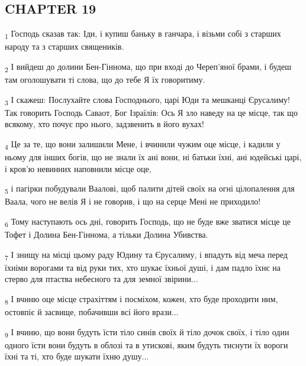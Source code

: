 \subsection{CHAPTER 19}
\begin{tcolorbox}
\textsubscript{1} Господь сказав так: Іди, і купиш баньку в ганчара, і візьми собі з старших народу та з старших священиків.
\end{tcolorbox}
\begin{tcolorbox}
\textsubscript{2} І вийдеш до долини Бен-Гіннома, що при вході до Череп'яної брами, і будеш там оголошувати ті слова, що до тебе Я їх говоритиму.
\end{tcolorbox}
\begin{tcolorbox}
\textsubscript{3} І скажеш: Послухайте слова Господнього, царі Юди та мешканці Єрусалиму! Так говорить Господь Саваот, Бог Ізраїлів: Ось Я зло наведу на це місце, так що всякому, хто почує про нього, задзвенить в його вухах!
\end{tcolorbox}
\begin{tcolorbox}
\textsubscript{4} Це за те, що вони залишили Мене, і вчинили чужим оце місце, і кадили у ньому для інших богів, що не знали їх ані вони, ні батьки їхні, ані юдейські царі, і кров'ю невинних наповнили місце оце,
\end{tcolorbox}
\begin{tcolorbox}
\textsubscript{5} і пагірки побудували Ваалові, щоб палити дітей своїх на огні цілопалення для Ваала, чого не велів Я і не говорив, і що на серце Мені не приходило!
\end{tcolorbox}
\begin{tcolorbox}
\textsubscript{6} Тому наступають ось дні, говорить Господь, що не буде вже зватися місце це Тофет і Долина Бен-Гіннома, а тільки Долина Убивства.
\end{tcolorbox}
\begin{tcolorbox}
\textsubscript{7} І знищу на місці цьому раду Юдину та Єрусалиму, і впадуть від меча перед їхніми ворогами та від руки тих, хто шукає їхньої душі, і дам падло їхнє на стерво для птаства небесного та для земної звірини...
\end{tcolorbox}
\begin{tcolorbox}
\textsubscript{8} І вчиню оце місце страхіттям і посміхом, кожен, хто буде проходити ним, остовпіє й засвище, побачивши всі його врази...
\end{tcolorbox}
\begin{tcolorbox}
\textsubscript{9} І вчиню, що вони будуть їсти тіло синів своїх й тіло дочок своїх, і тіло один одного їсти вони будуть в облозі та в утискові, яким будуть тиснути їх вороги їхні та ті, хто буде шукати їхню душу...
\end{tcolorbox}

